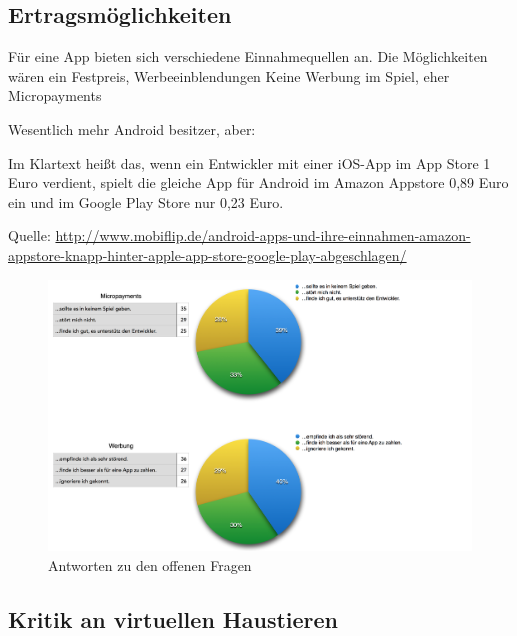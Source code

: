 \subsection{Ertragsmöglichkeiten}
Für eine App bieten sich verschiedene Einnahmequellen an. Die Möglichkeiten wären ein Festpreis, Werbeeinblendungen  
Keine Werbung im Spiel, eher Micropayments

Wesentlich mehr Android besitzer, aber: 

\glqq Im Klartext heißt das, wenn ein Entwickler mit einer iOS-App im App Store 1 Euro verdient, spielt die gleiche App für Android im Amazon Appstore 0,89 Euro ein und im Google Play Store nur 0,23 Euro.\grqq\

Quelle: \url{http://www.mobiflip.de/android-apps-und-ihre-einnahmen-amazon-appstore-knapp-hinter-apple-app-store-google-play-abgeschlagen/}

\begin{figure}[H]
    \centering
    \includegraphics[width=1.01\textwidth]{files/umfrage/finanzierung}
    \caption{Antworten zu den offenen Fragen}
\end{figure}



\subsection{Kritik an virtuellen Haustieren}

